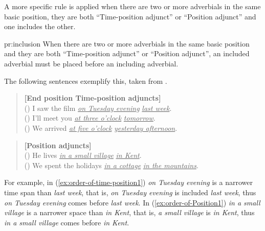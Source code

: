 A more specific rule is applied when there are two or more adverbials
in the same basic position, they are both ``Time-position adjunct''
or ``Position adjunct'' and one includes the other.

\begin{pr}{pr:inclusion}{}
     When there are two or more adverbials in the same basic position 
     and they are both ``Time-position adjunct'' or  ``Position adjunct'',
     an included adverbial must be placed before an including adverbial.
\end{pr}

The following sentences exemplify this, taken from  .

\begin{singlespace}
\begin{quote}
 \small
{\bf [End position Time-position adjuncts]} \\
 ()
I saw the film \underline{\em on Tuesday evening} \underline{\em last week}. \\
 ()
I'll meet you \underline{\em at three o'clock} \underline{\em tomorrow}. \\
 ()
We arrived \underline{\em at five o'clock} \underline{\em yesterday afternoon}.
\end{quote}
\end{singlespace}

\begin{singlespace}
\begin{quote}
 \small
{\bf [Position adjuncts]} \\
 ()
He lives \underline{\em in a small village} \underline{\em in Kent}. \\
 ()
We spent the holidays \underline{\em in a cottage} 
\underline{\em in the mountains}.
\end{quote}
\end{singlespace}

For example, in (\ref{ex:order-of-time-position1})
{\em on Tuesday evening} is a narrower time span than {\em last week}, 
that is, {\em on Tuesday evening} is included {\em last week}, 
thus {\em on Tuesday evening} comes before {\em last week}.
In (\ref{ex:order-of-Position1}) 
{\em in a small village} is a narrower space than {\em in Kent}, 
that is, {\em a small village} is {\em in Kent}, 
thus {\em in a small village} comes before {\em in Kent}. 

